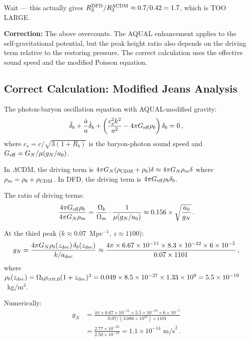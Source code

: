 \documentclass[11pt]{article}
\newcommand{\ee}[1]{\times 10^{#1}}
\newcommand{\LCDM}{$\Lambda$CDM}
\newcommand{\Geff}{G_{\rm eff}}
\newcommand{\aM}{a_0}
\newcommand{\Ob}{\Omega_b}
\newcommand{\Om}{\Omega_m}
\begin{document}
Wait --- this actually gives $R_3^{\rm DFD}/R_3^{\Lambda\rm CDM}
\approx 0.7/0.42 = 1.7$, which is TOO LARGE.

\textbf{Correction:}  The above overcounts.  The AQUAL enhancement applies
to the self-gravitational potential, but the peak height ratio also depends
on the driving term relative to the restoring pressure.  The correct
calculation uses the effective sound speed and the modified Poisson equation.

\subsection{Correct Calculation: Modified Jeans Analysis}

The photon-baryon oscillation equation with AQUAL-modified gravity:
\begin{equation}
\ddot\delta_b + \frac{\dot{a}}{a}\dot\delta_b
+ \left(\frac{c_s^2 k^2}{a^2} - 4\pi\Geff\rho_b\right)\delta_b = 0\,,
\label{eq:Jeans-AQUAL}
\end{equation}
where $c_s = c/\sqrt{3(1+R_b)}$ is the baryon-photon sound speed and
$\Geff = G_N/\mu(g_N/\aM)$.

In \LCDM, the driving term is $4\pi G_N(\rho_{\rm CDM} + \rho_b)\delta
\approx 4\pi G_N\rho_m\delta$ where $\rho_m = \rho_b + \rho_{\rm CDM}$.
In DFD, the driving term is $4\pi\Geff\rho_b\delta_b$.

The ratio of driving terms:
\begin{equation}
\frac{4\pi\Geff\rho_b}{4\pi G_N\rho_m}
= \frac{\Ob}{\Om}\cdot\frac{1}{\mu(g_N/\aM)}
\approx 0.156\times\sqrt{\frac{\aM}{g_N}}\,.
\label{eq:driving-ratio}
\end{equation}

At the third peak ($k \approx 0.07$~Mpc$^{-1}$, $z \approx 1100$):
\begin{equation}
g_N = \frac{4\pi G_N\rho_b(z_{\rm dec})\,\delta_b(z_{\rm dec})}{k/a_{\rm dec}}
\approx \frac{4\pi\times 6.67\ee{-11}\times 8.3\times 10^{-22}\times 6\ee{-5}}
{0.07\times 1101}\,,
\end{equation}
where $\rho_b(z_{\rm dec}) = \Ob\rho_{\rm crit,0}(1+z_{\rm dec})^3
= 0.049\times 8.5\ee{-27}\times 1.33\ee{9} = 5.5\ee{-19}$~kg/m$^3$.

Numerically:
\begin{align}
g_N &= \frac{4\pi\times 6.67\ee{-11}\times 5.5\ee{-19}\times 6\ee{-5}}
{0.07/(3.086\ee{22})\times 1101} \\
&= \frac{2.77\ee{-32}}{2.50\ee{-18}} = 1.1\ee{-14}\text{ m/s}^2\,.
\end{align}
\end{document}
